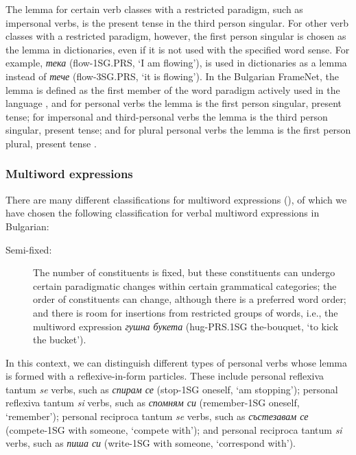 \documentclass[output=paper,colorlinks,citecolor=brown]{langscibook}
\begin{document}
The lemma for certain verb classes with a restricted paradigm, such as impersonal verbs, is the present tense in the third person singular. For other verb classes with a restricted paradigm, however, the first person singular is chosen as the lemma in dictionaries, even if it is not used with the specified word sense. For example, \textit{тека} (flow-1SG.PRS, `I am flowing'), is used in dictionaries as a lemma instead of \textit{тече} (flow-3SG.PRS, `it is flowing'). In the Bulgarian FrameNet, the lemma is defined as the first member of the word paradigm actively used in the language \citep[25]{Koeva2008}, and for personal verbs the lemma is the first person singular, present tense; for impersonal and third-personal verbs the lemma is the third person singular, present tense; and for plural personal verbs the lemma is the first person plural, present tense \citep[19]{Koeva2010}.

\subsubsection{Multiword expressions} 

There are many different classifications for multiword expressions (\cite{baldwin2010multiword,constant-etal-2017-survey}), of which we have chosen the following classification for verbal multiword expressions in Bulgarian:

\begin{description}
\item[Semi-fixed:] The number of constituents is fixed, but these constituents can undergo certain paradigmatic changes within certain grammatical categories; the order of constituents can change, although there is a preferred word order; and there is room for insertions from restricted groups of words, i.e., the multiword expression \textit{гушна букета} (hug-PRS.1SG the-bouquet, `to kick the bucket').
\end{description}
In this context, we can distinguish different types of personal verbs whose lemma is formed with a reflexive-in-form particles. These include personal reflexiva tantum \textit{se} verbs, such as \emph{спирам се} (stop-1SG oneself, `am stopping'); personal reflexiva tantum \textit{si} verbs, such as \emph{спомням си} (remember-1SG oneself, `remember'); personal reciproca tantum \textit{se} verbs, such as \emph{състезавам се} (compete-1SG with someone, `compete with'); and personal reciproca tantum \textit{si} verbs, such as \emph{пиша си} (write-1SG with someone, `correspond with').
\end{document}
